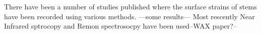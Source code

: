 There have been a number of studies published where the surface strains of stems have been recorded using various methods. ---some results--- Most rescently  Near Infrared sptrocopy and Remon spectrosocpy have been used--WAX paper?--